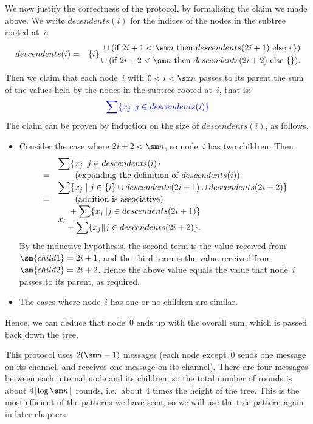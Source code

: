 
We now justify the correctness of the protocol, by formalising the claim we
made above.  We write $decendents(i)$ for the indices of the nodes in the
subtree rooted at~$i$:
%
\begin{eqnarray*}
descendents(i) & = & 
  \set{i} 
    \begin{align}
      \null \union (\If 2i+1 < \sm n \mbox{ then } descendents(2i+1) 
      \mbox{ else } \set{}) \\
      \null \union
      (\If 2i+2 < \sm n  \mbox{ then }  descendents(2i+2) \mbox{ else } \set{}).
    \end{align}
\end{eqnarray*}
%
Then we claim that each node~$i$ with $0 < i < \sm n$ passes to its parent the
sum of the values held by the nodes in the subtree rooted at~$i$, that is:
%
\[\mstyle
\sum \set{x_j \| j \in descendents(i)}
\]
The claim can be proven by induction on the size of $descendents(i)$, as
follows.
%
\begin{itemize}
\item
Consider the case where $2i + 2 < \sm n$, so node~$i$ has two children.  Then
\[
\begin{array}{cl}
& \displaystyle\sum \set{x_j \| j \in descendents(i)}  \\
= & \qquad\mbox{(expanding the definition of $descendents(i)$)} \\

& \displaystyle\sum 
  \set{x_j \mid j \in \set{i} \union  descendents(2i+1) \union
               descendents(2i+2) } \\
= & \qquad\mbox{(addition is associative)} \\ 
& x_i 
  \begin{align}
  \null + \displaystyle \sum \set{x_j \| j \in descendents(2i+1)} \\
  \null + \displaystyle \sum \set{x_j \| j \in descendents(2i+2)}.
  \end{align}
\end{array}
\]
By the inductive hypothesis, the second term is the value received from
$\sm{child1} = 2i+1$, and the third term is the value received from
$\sm{child2} = 2i+2$.  Hence the above value equals the value that node~$i$
passes to its parent, as required.

\item
The cases where node~$i$ has one or no children are similar.
\end{itemize}
%
Hence, we can deduce that node~$0$ ends up with the overall sum, which is
passed back down the tree.

This protocol uses $2(\sm n-1)$ messages (each node except~0 sends one message
on its  channel, and receives one message on its 
channel).  There are four messages between each internal node and its
children, so the total number of rounds is about $4\lfloor \log \sm n \rfloor$
rounds, i.e.~about $4$ times the height of the tree.  This is the most
efficient of the patterns we have seen, so we will use the tree pattern again
in later chapters.
